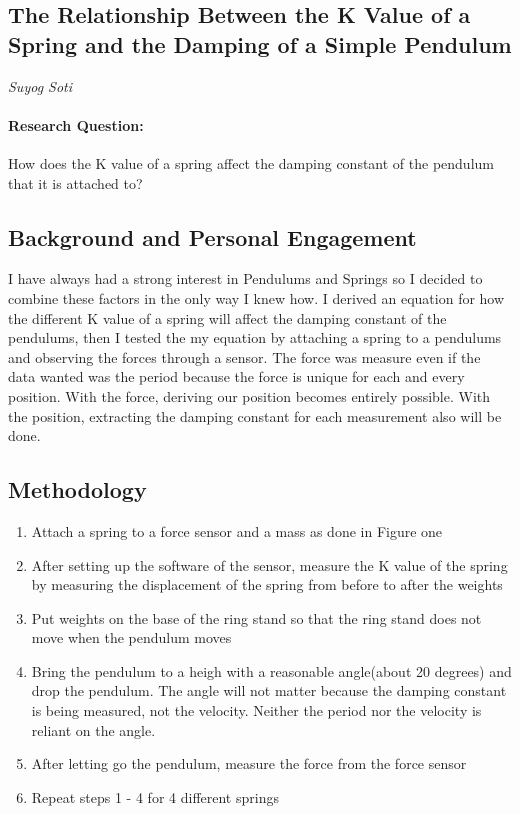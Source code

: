 \documentclass{report}
\begin{document}
\begin{center}
\section*{The Relationship Between the K Value of a Spring and the Damping of a Simple Pendulum}
\textit{Suyog Soti}
\end{center}

\paragraph{Research Question:} How does the K value of a spring affect the damping constant of the pendulum that it is attached to?

\subsection*{Background and Personal Engagement}
\indent I have always had a strong interest in Pendulums and Springs so I decided to combine these factors in the only way I knew how. I derived an equation for how the different K value of a spring will affect the damping constant of the pendulums, then I tested the my equation by attaching a spring to a pendulums and observing the forces through a sensor. The force was measure even if the data wanted was the period because the force is unique for each and every position. With the force, deriving our position becomes entirely possible. With the position, extracting the damping constant for each measurement also will be done.

\subsection*{Methodology}
\begin{enumerate}
\item Attach a spring to a force sensor and a mass as done in Figure one
\item After setting up the software of the sensor, measure the K value of the spring by measuring the displacement of the spring from before to after the weights
\item Put weights on the base of the ring stand so that the ring stand does not move when the pendulum moves
\item Bring the pendulum to a heigh with a reasonable angle(about 20 degrees) and drop the pendulum. The angle will not matter because the damping constant is being measured, not the velocity. Neither the period nor the velocity is reliant on the angle.
\item After letting go the pendulum, measure the force from the force sensor
\item Repeat steps 1 - 4 for 4 different springs
\end{enumerate}
\end{document}
